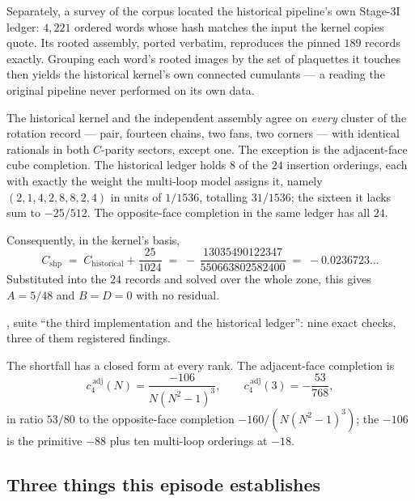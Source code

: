 Separately, a survey of the corpus located the historical pipeline's own
Stage-3I ledger: $4{,}221$ ordered words whose hash matches the input
the kernel copies quote. Its rooted assembly, ported verbatim, reproduces
the pinned $189$ records exactly. Grouping each word's rooted images by
the set of plaquettes it touches then yields the historical kernel's own
connected cumulants --- a reading the original pipeline never performed
on its own data.

\begin{theorem}
\label{thm:cshp}
The historical kernel and the independent assembly agree on \emph{every}
cluster of the rotation record --- pair, fourteen chains, two fans, two
corners --- with identical rationals in both $C$-parity sectors, except
one. The exception is the adjacent-face cube completion. The historical
ledger holds $8$ of the $24$ insertion orderings, each with exactly the
weight the multi-loop model assigns it, namely
$(2,1,4,2,8,8,2,4)$ in units of $1/1536$, totalling $31/1536$; the
sixteen it lacks sum to $-25/512$. The opposite-face completion in the
same ledger has all $24$.

Consequently, in the kernel's basis,
\begin{equation}
  C_{\mathrm{shp}}
  \;=\; C_{\mathrm{historical}} + \frac{25}{1024}
  \;=\; -\,\frac{13035490122347}{550663802582400}
  \;=\; -0.0236723\ldots
  \label{eq:cshp}
\end{equation}
Substituted into the $24$ records and solved over the whole zone, this
gives $A = 5/48$ and $B = D = 0$ with no residual.
\end{theorem}

\noindent\Tone{}, suite ``the third implementation and the historical
ledger'': nine exact checks, three of them registered findings.

The shortfall has a closed form at every rank. The adjacent-face
completion is
\begin{equation}
  c_4^{\,\mathrm{adj}}(N) = \frac{-106}{N(N^2-1)^3},
  \qquad
  c_4^{\,\mathrm{adj}}(3) = -\frac{53}{768},
\end{equation}
in ratio $53/80$ to the opposite-face completion $-160/(N(N^2-1)^3)$;
the $-106$ is the primitive $-88$ plus ten multi-loop orderings at
$-18$.

\subsection{Three things this episode establishes}

